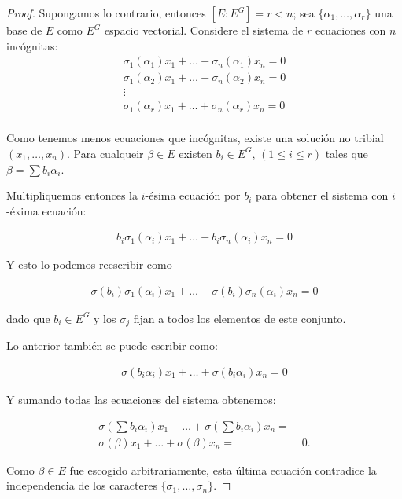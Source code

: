 \begin{proof}
    Supongamos lo contrario, entonces $[E : E^G] = r < n$; sea $\{ \alpha_1, \dots, \alpha_r \}$ una base de $E$ como
    $E^G$ espacio vectorial. Considere el sistema de $r$ ecuaciones con $n$ incógnitas:
    \begin{align}
        \sigma_1(\alpha_1) x_1  +   \dots   + \sigma_n(\alpha_1) x_n  =   0   \\
        \sigma_1(\alpha_2) x_1  +   \dots   + \sigma_n(\alpha_2) x_n  =   0   \\
        \vdots                                                                \\
        \sigma_1(\alpha_r) x_1  +   \dots   + \sigma_n(\alpha_r) x_n  =   0   \\
    \end{align}
    
    Como tenemos menos ecuaciones que incógnitas, existe una solución no tribial $(x_1, \dots, x_n)$. Para cualqueir 
    $\beta \in E$ existen $b_i \in E^G$, $(1 \leq i \leq r)$ tales que $\beta = \sum b_i \alpha_i$.\par\null
    
    Multipliquemos entonces la $i$-ésima ecuación por $b_i$ para obtener el sistema con $i$-éxima ecuación:
    
    \begin{align}
        b_i\sigma_1(\alpha_i) x_1  +   \dots   + b_i\sigma_n(\alpha_i) x_n  =   0  
    \end{align}
    
    Y esto lo podemos reescribir como
    
    \begin{align}
        \sigma(b_i)\sigma_1(\alpha_i) x_1  +   \dots   + \sigma(b_i)\sigma_n(\alpha_i) x_n  =   0   
    \end{align}
    
    dado que $b_i \in E^G$ y los $\sigma_j$ fijan a todos los elementos de este conjunto.\par\null
    
    Lo anterior también se puede escribir como:
        
    \begin{align}
        \sigma(b_i\alpha_i) x_1  +   \dots   + \sigma(b_i\alpha_i) x_n  =   0   
    \end{align}
    
    Y sumando todas las ecuaciones del sistema obtenemos:
    
    \begin{align}
        \sigma \left(\sum b_i\alpha_i \right) x_1  +   \dots   + \sigma \left(\sum b_i\alpha_i\right) x_n  = &  \\
        \sigma(\beta) x_1  +   \dots   + \sigma(\beta) x_n  =&   \;0.   
    \end{align}\par\null
    
    Como $\beta \in E$ fue escogido arbitrariamente, esta última ecuación contradice la independencia de los caracteres
    $\{ \sigma_1, \dots, \sigma_n \}$.
\end{proof}